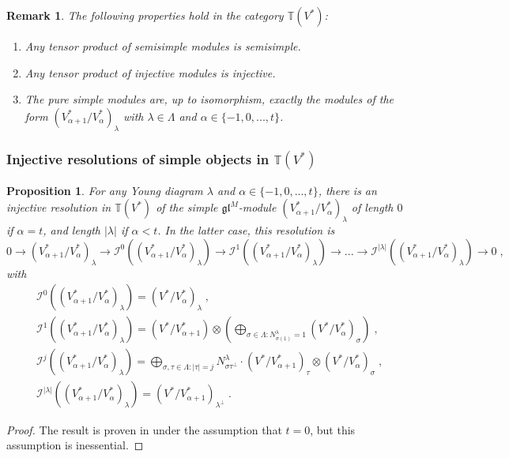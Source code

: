 \documentclass[12pt]{article}
\def\TT {{\mathbb T}}     %
\def\mc {\mathcal}
\def\mk {\mathfrak}
\newtheorem{prop}[theorem]{Proposition}
\newtheorem{rem}{Remark}[section]
\begin{document}
\begin{rem}
The following properties hold in the category $\TT(V^*)$:
\begin{enumerate}
\item Any tensor product of semisimple modules is semisimple.
\item Any tensor product of injective modules is injective.
\item The pure simple modules are, up to isomorphism, exactly the modules of the form $(V^*_{\alpha+1}/V^*_{\alpha})_\lambda$ with $\lambda\in\Lambda$ and $\alpha\in\{-1,0,...,t\}$.
\end{enumerate}
\end{rem}



\subsubsection{Injective resolutions of simple objects in $\TT(V^*)$}


\begin{prop}\label{Prop InjResLlambda}
For any Young diagram $\lambda$ and $\alpha\in\{-1,0,...,t\}$, there is an injective resolution in $\TT(V^*)$ of the simple $\mk{gl}^M$-module $(V^*_{\alpha+1}/V^*_{\alpha})_{\lambda}$ of length $0$ if $\alpha=t$, and length $|\lambda|$ if $\alpha<t$. In the latter case, this resolution is
$$
0\to (V^*_{\alpha+1}/V^*_{\alpha})_{\lambda} \to \mc I^0((V^*_{\alpha+1}/V^*_{\alpha})_{\lambda}) \to \mc I^1((V^*_{\alpha+1}/V^*_{\alpha})_{\lambda}) \to ... \to \mc I^{|\lambda|}((V^*_{\alpha+1}/V^*_{\alpha})_{\lambda}) \to 0 \;,
$$
with
\begin{align*}
& \mc I^0((V^*_{\alpha+1}/V^*_{\alpha})_{\lambda}) = (V^*/V^*_{\alpha})_{\lambda} \;,\\
& \mc I^1((V^*_{\alpha+1}/V^*_{\alpha})_{\lambda}) = (V^*/V^*_{\alpha+1})\otimes (\bigoplus\limits_{\sigma\in\Lambda:N^{\lambda}_{\sigma(1)}=1}(V^*/V^*_{\alpha})_{\sigma}) \;,\\
& \mc I^j((V^*_{\alpha+1}/V^*_{\alpha})_{\lambda}) = \bigoplus\limits_{\sigma,\tau\in\Lambda:|\tau|=j}N_{\sigma\tau^\perp}^{\lambda} \cdot (V^*/V^*_{\alpha+1})_{\tau}\otimes (V^*/V^*_{\alpha})_{\sigma} \;,\\
& \mc I^{|\lambda|}((V^*_{\alpha+1}/V^*_{\alpha})_{\lambda}) = (V^*/V^*_{\alpha+1})_{\lambda^\perp} \;.
\end{align*}
\end{prop}

\begin{proof}
The result is proven in \cite{Chirvasitu-Penkov-OTC} under the assumption that $t=0$, but this assumption is inessential.
\end{proof}
\end{document}
